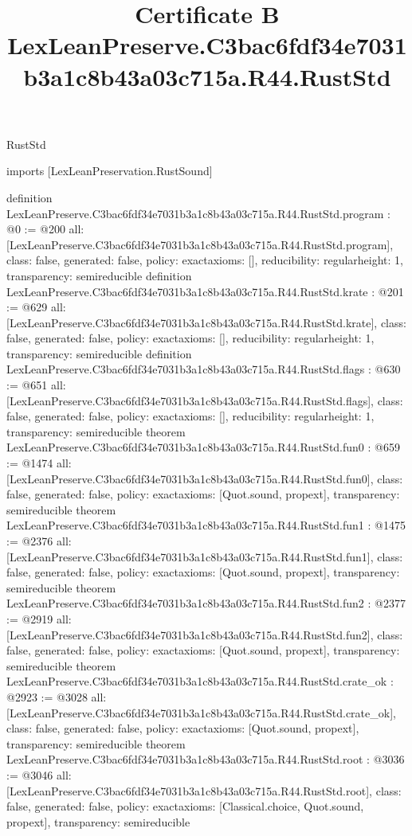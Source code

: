 \begin{lexlean}{RustStd}
\title{Certificate B LexLeanPreserve.C3bac6fdf34e7031b3a1c8b43a03c715a.R44.RustStd}
\begin{coremodule}
imports [LexLeanPreservation.RustSound]

definition LexLeanPreserve.C3bac6fdf34e7031b3a1c8b43a03c715a.R44.RustStd.program : @0 := @200 {
  all: [LexLeanPreserve.C3bac6fdf34e7031b3a1c8b43a03c715a.R44.RustStd.program],
  class: false,
  generated: false,
  policy: exact{axioms: []},
  reducibility: regular{height: 1},
  transparency: semireducible
}
definition LexLeanPreserve.C3bac6fdf34e7031b3a1c8b43a03c715a.R44.RustStd.krate : @201 := @629 {
  all: [LexLeanPreserve.C3bac6fdf34e7031b3a1c8b43a03c715a.R44.RustStd.krate],
  class: false,
  generated: false,
  policy: exact{axioms: []},
  reducibility: regular{height: 1},
  transparency: semireducible
}
definition LexLeanPreserve.C3bac6fdf34e7031b3a1c8b43a03c715a.R44.RustStd.flags : @630 := @651 {
  all: [LexLeanPreserve.C3bac6fdf34e7031b3a1c8b43a03c715a.R44.RustStd.flags],
  class: false,
  generated: false,
  policy: exact{axioms: []},
  reducibility: regular{height: 1},
  transparency: semireducible
}
theorem LexLeanPreserve.C3bac6fdf34e7031b3a1c8b43a03c715a.R44.RustStd.fun0 : @659 := @1474 {
  all: [LexLeanPreserve.C3bac6fdf34e7031b3a1c8b43a03c715a.R44.RustStd.fun0],
  class: false,
  generated: false,
  policy: exact{axioms: [Quot.sound, propext]},
  transparency: semireducible
}
theorem LexLeanPreserve.C3bac6fdf34e7031b3a1c8b43a03c715a.R44.RustStd.fun1 : @1475 := @2376 {
  all: [LexLeanPreserve.C3bac6fdf34e7031b3a1c8b43a03c715a.R44.RustStd.fun1],
  class: false,
  generated: false,
  policy: exact{axioms: [Quot.sound, propext]},
  transparency: semireducible
}
theorem LexLeanPreserve.C3bac6fdf34e7031b3a1c8b43a03c715a.R44.RustStd.fun2 : @2377 := @2919 {
  all: [LexLeanPreserve.C3bac6fdf34e7031b3a1c8b43a03c715a.R44.RustStd.fun2],
  class: false,
  generated: false,
  policy: exact{axioms: [Quot.sound, propext]},
  transparency: semireducible
}
theorem LexLeanPreserve.C3bac6fdf34e7031b3a1c8b43a03c715a.R44.RustStd.crate_ok : @2923 := @3028 {
  all: [LexLeanPreserve.C3bac6fdf34e7031b3a1c8b43a03c715a.R44.RustStd.crate_ok],
  class: false,
  generated: false,
  policy: exact{axioms: [Quot.sound, propext]},
  transparency: semireducible
}
theorem LexLeanPreserve.C3bac6fdf34e7031b3a1c8b43a03c715a.R44.RustStd.root : @3036 := @3046 {
  all: [LexLeanPreserve.C3bac6fdf34e7031b3a1c8b43a03c715a.R44.RustStd.root],
  class: false,
  generated: false,
  policy: exact{axioms: [Classical.choice, Quot.sound, propext]},
  transparency: semireducible
}


\end{coremodule}
\end{lexlean}
